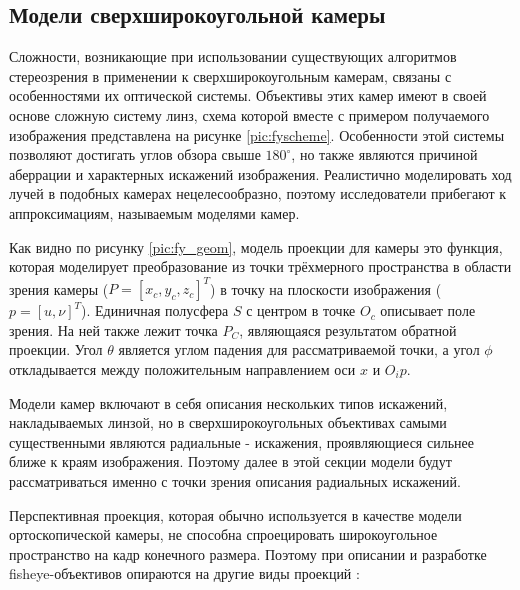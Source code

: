 \subsection{Модели сверхширокоугольной камеры}
\label{camera_model}
Сложности, возникающие при использовании существующих алгоритмов стереозрения  в применении к сверхширокоугольным камерам, связаны с
 особенностями их оптической системы. Объективы  этих камер имеют в своей основе сложную систему линз, схема которой вместе с примером
 получаемого изображения представлена на рисунке \ref{pic:fyscheme}. Особенности этой системы позволяют достигать углов обзора свыше $180^\circ$,
  но также являются причиной аберрации и характерных искажений изображения. Реалистично моделировать ход лучей в подобных камерах 
нецелесообразно, поэтому исследователи прибегают к аппроксимациям, называемым моделями камер.   %


Как видно по рисунку \ref{pic:fy_geom}, модель проекции для камеры это функция, которая моделирует преобразование 
из точки трёхмерного пространства  в области зрения камеры ($P=[x_c, y_c, z_c]^T$) в точку на плоскости изображения ($p=[u, \nu]^T$). Единичная            %
полусфера $S$ с центром в точке $O_c$ описывает поле зрения. На ней также лежит точка $P_C$, являющаяся результатом обратной проекции.    %
Угол $\theta$ является углом падения для рассматриваемой точки, а угол $\phi$ откладывается между положительным направлением оси $x$ и $O_{i}{p}$. 


Модели камер включают в себя описания нескольких типов искажений, накладываемых линзой, но в сверхширокоугольных объективах самыми существенными являются 
радиальные - искажения, проявляющиеся сильнее ближе к краям изображения. Поэтому далее в этой секции модели будут рассматриваться именно с точки зрения 
описания радиальных искажений. 


Перспективная проекция, которая обычно используется в качестве модели ортоскопической камеры, не способна спроецировать широкоугольное пространство на кадр 
конечного размера. Поэтому при описании и разработке fisheye-объективов опираются на другие виды проекций  \cite{projections}:

